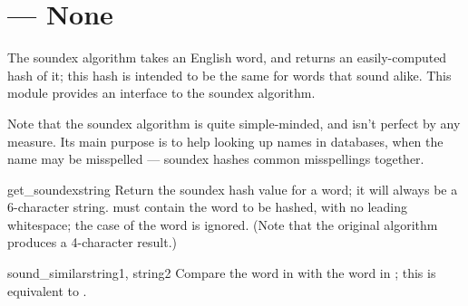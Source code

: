 \section{ ---
         None}




The soundex algorithm takes an English word, and returns an
easily-computed hash of it; this hash is intended to be the same for
words that sound alike.  This module provides an interface to the
soundex algorithm.

Note that the soundex algorithm is quite simple-minded, and isn't
perfect by any measure.  Its main purpose is to help looking up names
in databases, when the name may be misspelled --- soundex hashes common
misspellings together.

\begin{funcdesc}{get_soundex}{string}
Return the soundex hash value for a word; it will always be a
6-character string.   must contain the word to be hashed,
with no leading whitespace; the case of the word is ignored.  (Note
that the original algorithm produces a 4-character result.)
\end{funcdesc}

\begin{funcdesc}{sound_similar}{string1, string2}
Compare the word in  with the word in ; this
is equivalent to 
 \code{==}
.
\end{funcdesc}


\begin{seealso}


\end{seealso}
